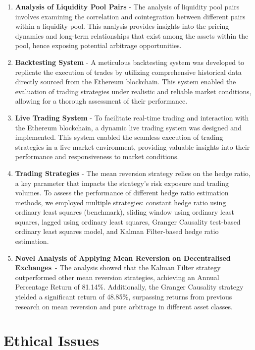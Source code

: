 \begin{enumerate}[wide, labelwidth=!, labelindent=2ex]
    \itemsep-0.1em
    \item \textbf{Analysis of Liquidity Pool Pairs} - The analysis of liquidity pool pairs involves examining the correlation and cointegration between different pairs within a liquidity pool. This analysis provides insights into the pricing dynamics and long-term relationships that exist among the assets within the pool, hence exposing potential arbitrage opportunities. 
    \item \textbf{Backtesting System} - A meticulous backtesting system was developed to replicate the execution of trades by utilizing comprehensive historical data directly sourced from the Ethereum blockchain. This system enabled the evaluation of trading strategies under realistic and reliable market conditions, allowing for a thorough assessment of their performance.
    \item \textbf{Live Trading System} - To facilitate real-time trading and interaction with the Ethereum blockchain, a dynamic live trading system was designed and implemented. This system enabled the seamless execution of trading strategies in a live market environment, providing valuable insights into their performance and responsiveness to market conditions.
    \item \textbf{Trading Strategies} - The mean reversion strategy relies on the hedge ratio, a key parameter that impacts the strategy's risk exposure and trading volumes. To assess the performance of different hedge ratio estimation methods, we employed multiple strategies: constant hedge ratio using ordinary least squares (benchmark), sliding window using ordinary least squares, lagged using ordinary least squares, Granger Causality test-based ordinary least squares model, and Kalman Filter-based hedge ratio estimation.
    \item \textbf{Novel Analysis of Applying Mean Reversion on Decentralised Exchanges}~- The analysis showed that the Kalman Filter strategy outperformed other mean reversion strategies, achieving an Annual Percentage Return of 81.14\%. Additionally, the Granger Causality strategy yielded a significant return of 48.85\%, surpassing returns from previous research on mean reversion and pure arbitrage in different asset classes.
\end{enumerate}

\section{Ethical Issues}

